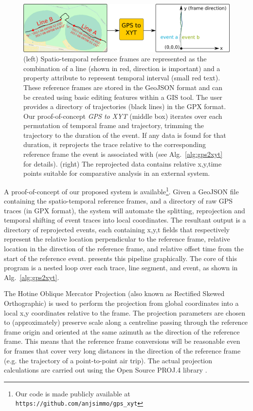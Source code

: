 \begin{figure}
\includegraphics[width=1.0\textwidth]{figs/paper/automated-process-v3-export}
\caption{(left) Spatio-temporal reference frames are represented as the combination of a line (shown in red, direction is important) and a property attribute to represent temporal interval (small red text). These reference frames are stored in the GeoJSON format and can be created using basic editing features within a GIS tool. The user provides a directory of trajectories (black lines) in the GPX format. Our proof-of-concept \textit{GPS to XYT} (middle box) iterates over each permutation of temporal frame and trajectory, trimming the trajectory to the duration of the event. If any data is found for that duration, it reprojects the trace relative to the corresponding reference frame the event is associated with (see Alg.~\ref{alg:gps2xyt} for details). (right) The reprojected data contains relative x,y,time points suitable for comparative analysis in an external system.}
\label{fig:automated-process}
\end{figure}

A proof-of-concept of our proposed system is available\footnote{Our code is made publicly available at \texttt{https://github.com/anjsimmo/gps\_xyt}}. Given a GeoJSON file containing the spatio-temporal reference frames, and a directory of raw GPS traces (in GPX format), the system will automate the splitting, reprojection and temporal shifting of event traces into local coordinates. The resultant output is a directory of reprojected events, each containing x,y,t fields that respectively represent the relative location perpendicular to the reference frame, relative location in the direction of the reference frame, and relative offset time from the start of the reference event.  presents this pipeline graphically. The core of this program is a nested loop over each trace, line segment, and event, as shown in Alg.~\ref{alg:gps2xyt}.

The Hotine Oblique Mercator Projection (also known as Rectified Skewed Orthographic) \cite[66]{snyder_map_1987} is used to perform the projection from global coordinates into a local x,y coordinates relative to the frame. The projection parameters are chosen to (approximately) preserve scale along a centreline passing through the reference frame origin and oriented at the same azimuth as the direction of the reference frame. This means that the reference frame conversions will be reasonable even for frames that cover very long distances in the direction of the reference frame (e.g. the trajectory of a point-to-point air trip). The actual projection calculations are carried out using the Open Source PROJ.4 library \cite{evenden_libproj4_2005}.

